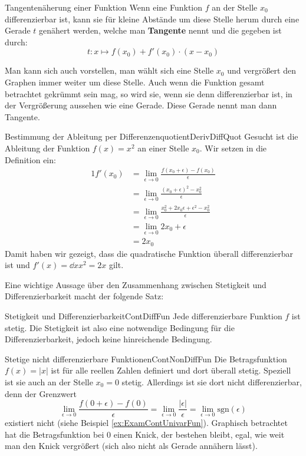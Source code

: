 \begin{definition}{Tangentenäherung einer Funktion}{}
    Wenn eine Funktion $f$ an der Stelle $x_0$ differenzierbar ist, kann sie für kleine Abstände um diese Stelle herum durch eine Gerade $t$ genähert werden, welche man \textbf{Tangente} nennt und die gegeben ist durch:
    $$
        t: x \mapsto f(x_0) + f'(x_0) \cdot (x-x_0)
    $$
\end{definition}

Man kann sich auch vorstellen, man wählt sich eine Stelle $x_0$ und vergrößert den Graphen immer weiter um diese Stelle. Auch wenn die Funktion gesamt betrachtet gekrümmt sein mag, so wird sie, wenn sie denn differenzierbar ist, in der Vergrößerung aussehen wie eine Gerade. Diese Gerade nennt man dann Tangente.

\begin{example}{Bestimmung der Ableitung per Differenzenquotient}{DerivDiffQuot}
    Gesucht ist die Ableitung der Funktion $f(x) = x^2$ an einer Stelle $x_0$. Wir setzen in die Definition ein:
    \begin{alignat}{1}
        f'(x_0) &= \lim\limits_{\epsilon\to 0} \frac{f(x_0+\epsilon) - f(x_0)}{\epsilon} \\
                &= \lim\limits_{\epsilon\to 0} \frac{(x_0+\epsilon)^2-x_0^2}{\epsilon} \\
                &= \lim\limits_{\epsilon\to 0} \frac{x_0^2+2x_0\epsilon+\epsilon^2-x_0^2}{\epsilon} \\
                &= \lim\limits_{\epsilon\to 0} 2x_0+\epsilon \\
                &= 2x_0
    \end{alignat}
    Damit haben wir gezeigt, dass die quadratische Funktion überall differenzierbar ist und $f'(x) = \dd{}{x} x^2 = 2x$ gilt.
\end{example}

Eine wichtige Aussage über den Zusammenhang zwischen Stetigkeit und Differenzierbarkeit macht der folgende Satz:

\begin{statement}{Stetigkeit und Differenzierbarkeit}{ContDiffFun}
    Jede differenzierbare Funktion $f$ ist stetig. Die Stetigkeit ist also eine notwendige Bedingung für die Differenzierbarkeit, jedoch keine hinreichende Bedingung.
\end{statement}

\begin{example}{Stetige nicht differenzierbare Funktionen}{ContNonDiffFun}
    Die Betragsfunktion $f(x) = |x|$ ist für alle reellen Zahlen definiert und dort überall stetig. Speziell ist sie auch an der Stelle $x_0=0$ stetig. Allerdings ist sie dort nicht differenzierbar, denn
    der Grenzwert
    $$
        \lim\limits_{\epsilon\to 0} \frac{f(0+\epsilon) - f(0)}{\epsilon} = \lim\limits_{\epsilon\to 0} \frac{|\epsilon|}{\epsilon} = \lim\limits_{\epsilon\to 0} \text{sgn}(\epsilon)
    $$
    existiert nicht (siehe Beispiel \ref{ex:ExamContUnivarFun}). Graphisch betrachtet hat die Betragsfunktion bei $0$ einen Knick, der bestehen bleibt, egal, wie weit man den Knick vergrößert (sich also nicht als Gerade annähern lässt).
\end{example}

